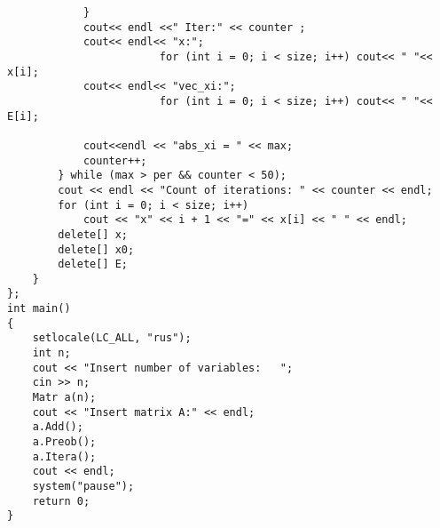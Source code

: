 \documentclass[14pt,a4paper]{scrartcl}
\theoremstyle{definition}
\theoremstyle{remark}
\theoremstyle{definition}
\theoremstyle{definition}
\begin{document}
{\begin{lstlisting}
            }
            cout<< endl <<" Iter:" << counter ;
            cout<< endl<< "x:";
                        for (int i = 0; i < size; i++) cout<< " "<< x[i];
            cout<< endl<< "vec_xi:";
                        for (int i = 0; i < size; i++) cout<< " "<< E[i];

            cout<<endl << "abs_xi = " << max;
            counter++;
        } while (max > per && counter < 50);
        cout << endl << "Count of iterations: " << counter << endl;
        for (int i = 0; i < size; i++)
            cout << "x" << i + 1 << "=" << x[i] << " " << endl;
        delete[] x;
        delete[] x0;
        delete[] E;
    }
};
int main()
{
    setlocale(LC_ALL, "rus");
    int n;
    cout << "Insert number of variables:   ";
    cin >> n;
    Matr a(n);
    cout << "Insert matrix A:" << endl;
    a.Add();
    a.Preob();
    a.Itera();
    cout << endl;
    system("pause");
    return 0;
}




\end{lstlisting}}
\end{document}
